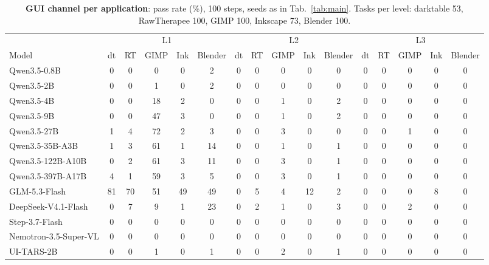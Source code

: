 \begin{table}[t]
  \centering
  \footnotesize
  \caption{\textbf{GUI channel per application}: pass rate (\%), 100 steps, seeds as in Tab.~\ref{tab:main}. Tasks per level: darktable 53, RawTherapee 100, GIMP 100, Inkscape 73, Blender 100.}
  \label{tab:app-gui}
  \setlength{\tabcolsep}{3.4pt}
  \begin{tabular}{@{}l ccccc @{\hspace{7pt}} ccccc @{\hspace{7pt}} ccccc@{}}
    \toprule
    & \multicolumn{5}{c}{L1} & \multicolumn{5}{c}{L2} & \multicolumn{5}{c}{L3} \\
    \cmidrule(r{7pt}){2-6}\cmidrule(r{7pt}){7-11}\cmidrule{12-16}
    Model & dt & RT & GIMP & Ink & Blender & dt & RT & GIMP & Ink & Blender & dt & RT & GIMP & Ink & Blender \\
    \midrule
    Qwen3.5-0.8B           & 0 & 0 & 0 & 0 & 2 & 0 & 0 & 0 & 0 & 0 & 0 & 0 & 0 & 0 & 0 \\
    Qwen3.5-2B             & 0 & 0 & 1 & 0 & 2 & 0 & 0 & 0 & 0 & 0 & 0 & 0 & 0 & 0 & 0 \\
    Qwen3.5-4B             & 0 & 0 & 18 & 2 & 0 & 0 & 0 & 1 & 0 & 2 & 0 & 0 & 0 & 0 & 0 \\
    Qwen3.5-9B             & 0 & 0 & 47 & 3 & 0 & 0 & 0 & 1 & 0 & 2 & 0 & 0 & 0 & 0 & 0 \\
    Qwen3.5-27B            & 1 & 4 & 72 & 2 & 3 & 0 & 0 & 3 & 0 & 0 & 0 & 0 & 1 & 0 & 0 \\
    Qwen3.5-35B-A3B        & 1 & 3 & 61 & 1 & 14 & 0 & 0 & 1 & 0 & 1 & 0 & 0 & 0 & 0 & 0 \\
    Qwen3.5-122B-A10B      & 0 & 2 & 61 & 3 & 11 & 0 & 0 & 3 & 0 & 1 & 0 & 0 & 0 & 0 & 0 \\
    Qwen3.5-397B-A17B      & 4 & 1 & 59 & 3 & 5 & 0 & 0 & 3 & 0 & 1 & 0 & 0 & 0 & 0 & 0 \\
    \midrule
    GLM-5.3-Flash          & 81 & 70 & 51 & 49 & 49 & 0 & 5 & 4 & 12 & 2 & 0 & 0 & 0 & 8 & 0 \\
    \midrule
    DeepSeek-V4.1-Flash    & 0 & 7 & 9 & 1 & 23 & 0 & 2 & 1 & 0 & 3 & 0 & 0 & 2 & 0 & 0 \\
    \midrule
    Step-3.7-Flash         & 0 & 0 & 0 & 0 & 0 & 0 & 0 & 0 & 0 & 0 & 0 & 0 & 0 & 0 & 0 \\
    \midrule
    Nemotron-3.5-Super-VL  & 0 & 0 & 0 & 0 & 0 & 0 & 0 & 0 & 0 & 0 & 0 & 0 & 0 & 0 & 0 \\
    \midrule
    UI-TARS-2B             & 0 & 0 & 1 & 0 & 1 & 0 & 0 & 2 & 0 & 1 & 0 & 0 & 0 & 0 & 0 \\

\end{tabular}
\end{table}
